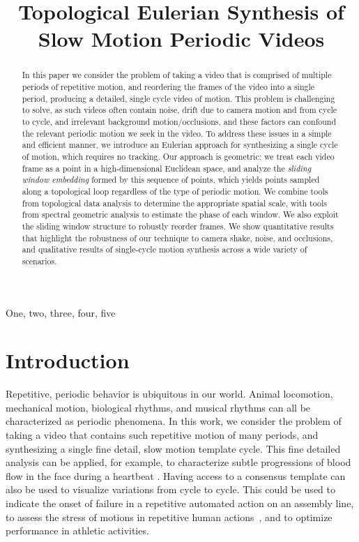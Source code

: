 \documentclass{article}
\title{Topological Eulerian Synthesis of Slow Motion Periodic Videos}
\begin{document}
%
\maketitle
%


\begin{abstract}

In this paper we consider the problem of taking a video that is comprised of multiple periods of repetitive motion, and reordering the frames of the video into a single period, producing a detailed, single cycle video of motion. This problem is challenging to solve, as such videos often contain noise, drift due to camera motion and from cycle to cycle, and irrelevant background motion/occlusions, and these factors can confound the relevant periodic motion we seek in the video. To address these issues in a simple and efficient manner, we introduce an Eulerian approach for synthesizing a single cycle of motion, which requires no tracking. Our approach is geometric: we treat each video frame as a point in a high-dimensional Euclidean space, and analyze the {\em sliding window embedding} formed by this sequence of points, which yields points sampled along a topological loop regardless of the type of periodic motion.  We combine tools from topological data analysis to determine the appropriate spatial scale, with tools from spectral geometric analysis to estimate the phase of each window.  We also exploit the sliding window structure to robustly reorder frames.  We show quantitative results that highlight the robustness of our technique to camera shake, noise, and occlusions, and qualitative results of single-cycle motion synthesis across a wide variety of scenarios.

\end{abstract}
%
\begin{keywords}
One, two, three, four, five
\end{keywords}
%


\section{Introduction}

Repetitive, periodic behavior is ubiquitous in our world. Animal locomotion, mechanical motion, biological rhythms, and musical rhythms can all be characterized as periodic phenomena.  In this work, we consider the problem of taking a video that contains such repetitive motion of many periods, and synthesizing a single fine detail, slow motion template cycle.  This fine detailed analysis can be applied, for example, to characterize subtle progressions of blood flow in the face during a heartbeat \cite{kumar2015distanceppg}.  Having access to a consensus template can also be used to visualize variations from cycle to cycle. This could be used to indicate the onset of failure in a repetitive automated action on an assembly line, to assess the stress of motions in repetitive human actions~\cite{greene2017visualizing}, and to optimize performance in athletic activities.
\end{document}
